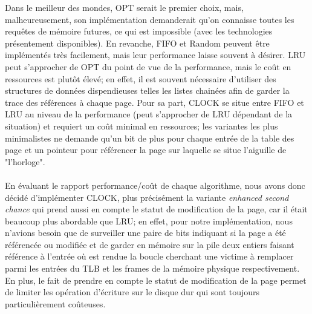 \documentclass{article}
\begin{document}
Dans le meilleur des mondes, OPT serait le premier choix, mais, malheureusement, son implémentation demanderait qu'on connaisse toutes les 
requêtes de mémoire futures, ce qui est impossible (avec les technologies présentement disponibles). En revanche, FIFO et Random peuvent être 
implémentés très facilement, mais leur performance laisse souvent à désirer. LRU peut s'approcher de OPT du point de vue de la performance, mais 
le coût en ressources est plutôt élevé; en effet, il est souvent nécessaire d'utiliser des structures de données dispendieuses telles les listes 
chainées afin de garder la trace des références à chaque page. Pour sa part, CLOCK se situe entre FIFO et LRU au niveau de la performance (peut 
s'approcher de LRU dépendant de la situation) et requiert un coût minimal en ressources; les variantes les plus minimalistes ne demande qu'un bit 
de plus pour chaque entrée de la table des page et un pointeur pour référencer la page sur laquelle se situe l'aiguille de "l'horloge".\\
\\
En évaluant le rapport performance/coût de chaque algorithme, nous avons donc décidé d'implémenter CLOCK, plus précisément la variante 
\emph{enhanced second chance} qui prend aussi en compte le statut de modification de la page, car il était beaucoup plus abordable que LRU; en 
effet, pour notre implémentation, nous n'avions besoin que de surveiller une paire de bits indiquant si la page a été référencée ou modifiée et 
de garder en mémoire sur la pile deux entiers faisant référence à l'entrée où est rendue la boucle cherchant une victime à remplacer parmi les 
entrées du TLB et les frames de la mémoire physique respectivement. En plus, le fait de prendre en compte le statut de modification de la page 
permet de limiter les opération d'écriture sur le disque dur qui sont toujours particulièrement coûteuses.\\ 
\\
\end{document}
